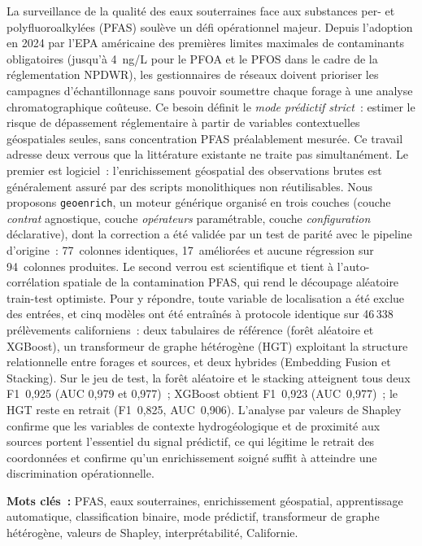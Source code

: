 \let\oldprintchaptertitle=\printchaptertitle
\renewcommand{\printchaptertitle}[1]{%
	\vspace*{-75pt}
	\oldprintchaptertitle{#1}
}%
\let\printchaptertitle=\oldprintchaptertitle

La surveillance de la qualit\'e des eaux souterraines face aux substances per- et polyfluoroalkyl\'ees (PFAS) soul\`eve un d\'efi op\'erationnel majeur. Depuis l'adoption en 2024 par l'EPA am\'ericaine des premi\`eres limites maximales de contaminants obligatoires (jusqu'\`a 4~ng/L pour le PFOA et le PFOS dans le cadre de la r\'eglementation NPDWR), les gestionnaires de r\'eseaux doivent prioriser les campagnes d'\'echantillonnage sans pouvoir soumettre chaque forage \`a une analyse chromatographique co\^uteuse. Ce besoin d\'efinit le \emph{mode pr\'edictif strict}~: estimer le risque de d\'epassement r\'eglementaire \`a partir de variables contextuelles g\'eospatiales seules, sans concentration PFAS pr\'ealablement mesur\'ee. Ce travail adresse deux verrous que la litt\'erature existante ne traite pas simultan\'ement. Le premier est logiciel~: l'enrichissement g\'eospatial des observations brutes est g\'en\'eralement assur\'e par des scripts monolithiques non r\'eutilisables. Nous proposons \texttt{geoenrich}, un moteur g\'en\'erique organis\'e en trois couches (couche \emph{contrat} agnostique, couche \emph{op\'erateurs} param\'etrable, couche \emph{configuration} d\'eclarative), dont la correction a \'et\'e valid\'ee par un test de parit\'e avec le pipeline d'origine~: 77~colonnes identiques, 17~am\'elior\'ees et aucune r\'egression sur 94~colonnes produites. Le second verrou est scientifique et tient \`a l'auto-corr\'elation spatiale de la contamination PFAS, qui rend le d\'ecoupage al\'eatoire train-test optimiste. Pour y r\'epondre, toute variable de localisation a \'et\'e exclue des entr\'ees, et cinq mod\`eles ont \'et\'e entra\^in\'es \`a protocole identique sur 46\,338 pr\'el\`evements californiens~: deux tabulaires de r\'ef\'erence (for\^et al\'eatoire et XGBoost), un transformeur de graphe h\'et\'erog\`ene (HGT) exploitant la structure relationnelle entre forages et sources, et deux hybrides (Embedding Fusion et Stacking). Sur le jeu de test, la for\^et al\'eatoire et le stacking atteignent tous deux F1~0,925 (AUC 0,979 et 0,977)~; XGBoost obtient F1~0,923 (AUC~0,977)~; le HGT reste en retrait (F1~0,825, AUC~0,906). L'analyse par valeurs de Shapley confirme que les variables de contexte hydrog\'eologique et de proximit\'e aux sources portent l'essentiel du signal pr\'edictif, ce qui l\'egitime le retrait des coordonn\'ees et confirme qu'un enrichissement soign\'e suffit \`a atteindre une discrimination op\'erationnelle.

\vspace{1cm}
\noindent\textbf{Mots cl\'es~:} PFAS, eaux souterraines, enrichissement g\'eospatial, apprentissage automatique, classification binaire, mode pr\'edictif, transformeur de graphe h\'et\'erog\`ene, valeurs de Shapley, interpr\'etabilit\'e, Californie.

\myCleanStarChapterEnd
